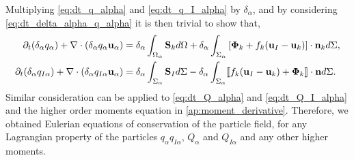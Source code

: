 Multiplying \ref{eq:dt_q_alpha} and \ref{eq:dt_q_I_alpha} by $\delta_\alpha$, and by considering \ref{eq:dt_delta_alpha_q_alpha} it is then trivial to show that,
\begin{align}
    \partial_t (\delta_\alpha q_\alpha)
    + \mathbf{\nabla} \cdot (\delta_\alpha q_\alpha \textbf{u}_\alpha)
    &= \delta_\alpha\int_{\Omega_\alpha} \textbf{S}_k d\Omega
    + \delta_\alpha\int_{\Sigma_\alpha} \left[\mathbf{\Phi}_k + f_k (\textbf{u}_I-\textbf{u}_k) \right] \cdot \textbf{n}_k d\Sigma,
    \label{eq:dt_dq_alpha}\\
    \partial_t (\delta_\alpha q_{I\alpha})
    + \mathbf{\nabla} \cdot(\delta_\alpha q_{I\alpha} \textbf{u}_\alpha)
    &= \delta_\alpha\int_{\Sigma_\alpha} 
        \textbf{S}_I
    d\Sigma
    - \delta_\alpha\int_{\Sigma_\alpha} \llbracket 
        f_k (\textbf{u}_I - \textbf{u}_k)
        + \mathbf{\Phi}_k
     \rrbracket \cdot \textbf{n}
    d\Sigma.
    \label{eq:dt_dq_I_alpha}
\end{align}
Similar consideration can be applied to \ref{eq:dt_Q_alpha} and \ref{eq:dt_Q_I_alpha} and the higher order moments equation in \ref{ap:moment_derivative}.
Therefore, we obtained Eulerian equations of conservation of the particle field, for any Lagrangian property of the particles $q_\alpha$\;$q_{I\alpha}$, $Q_\alpha$ and $Q_{I\alpha}$ and any other higher moments. 

